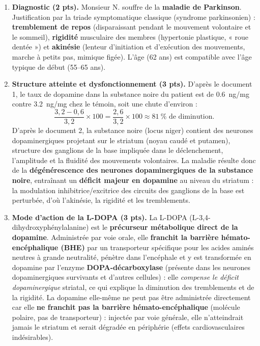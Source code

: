 \documentclass[11pt]{article}
\begin{document}
\begin{corrige}
\begin{enumerate}
\item \textbf{Diagnostic (2 pts).} Monsieur N. souffre de la \textbf{maladie de Parkinson}. Justification par la triade symptomatique classique (syndrome parkinsonien) : \textbf{tremblement de repos} (disparaissant pendant le mouvement volontaire et le sommeil), \textbf{rigidité} musculaire des membres (hypertonie plastique, « roue dentée ») et \textbf{akinésie} (lenteur d'initiation et d'exécution des mouvements, marche à petits pas, mimique figée). L'âge (62 ans) est compatible avec l'âge typique de début (55--65 ans).
\item \textbf{Structure atteinte et dysfonctionnement (3 pts).} D'après le document 1, le taux de dopamine dans la substance noire du patient est de \SI{0,6}{ng/mg} contre \SI{3,2}{ng/mg} chez le témoin, soit une chute d'environ :
\[ \dfrac{3,2 - 0,6}{3,2} \times 100 = \dfrac{2,6}{3,2} \times 100 \approx 81\ \% \text{ de diminution.} \]
D'après le document 2, la substance noire (locus niger) contient des neurones dopaminergiques projetant sur le striatum (noyau caudé et putamen), structure des ganglions de la base impliquée dans le déclenchement, l'amplitude et la fluidité des mouvements volontaires. La maladie résulte donc de la \textbf{dégénérescence des neurones dopaminergiques de la substance noire}, entraînant un \textbf{déficit majeur en dopamine} au niveau du striatum : la modulation inhibitrice/excitrice des circuits des ganglions de la base est perturbée, d'où l'akinésie, la rigidité et les tremblements.
\item \textbf{Mode d'action de la L-DOPA (3 pts).} La L-DOPA (L-3,4-dihydroxyphénylalanine) est le \textbf{précurseur métabolique direct de la dopamine}. Administrée par voie orale, elle \textbf{franchit la barrière hémato-encéphalique (BHE)} par un transporteur spécifique pour les acides aminés neutres à grande neutralité, pénètre dans l'encéphale et y est transformée en dopamine par l'enzyme \textbf{DOPA-décarboxylase} (présente dans les neurones dopaminergiques survivants et d'autres cellules) : elle \emph{compense le déficit dopaminergique} striatal, ce qui explique la diminution des tremblements et de la rigidité. La dopamine elle-même ne peut pas être administrée directement car elle \textbf{ne franchit pas la barrière hémato-encéphalique} (molécule polaire, pas de transporteur) : injectée par voie générale, elle n'atteindrait jamais le striatum et serait dégradée en périphérie (effets cardiovasculaires indésirables).

\end{enumerate}
\end{corrige}
\end{document}
